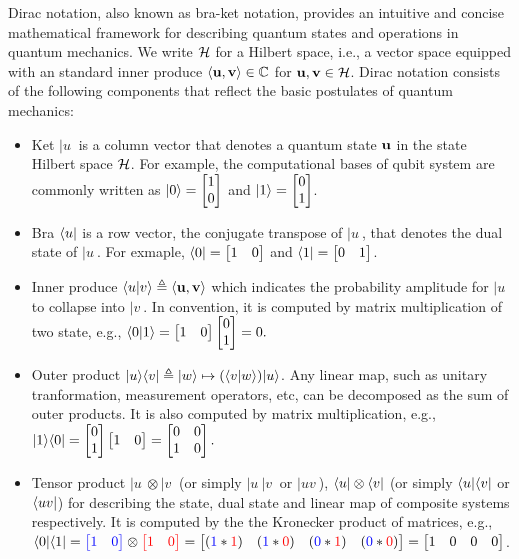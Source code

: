 Dirac notation, also known as bra-ket notation, provides an intuitive and concise mathematical framework for describing quantum states and operations in quantum mechanics. 
We write ${\mathcal{H}}$ for a Hilbert space, i.e., a vector space equipped with an standard inner produce $\langle{\mathbf{u}},{\mathbf{v}}\rangle \in {\mathbb{C}}$ for ${\mathbf{u}},{\mathbf{v}}\in{\mathcal{H}}$.
Dirac notation consists of the following components that reflect the basic postulates of quantum mechanics:
\begin{itemize}
  \item Ket $|u\>$ is a column vector that denotes a quantum state ${\mathbf{u}}$ in the state Hilbert space ${\mathcal{H}}$. For example, the computational bases of qubit system are commonly written as $|0\rangle = \begin{bmatrix}1 \\ 0\end{bmatrix}$ and $|1\rangle = \begin{bmatrix}0 \\ 1\end{bmatrix}$.
  \item Bra $\langle u|$ is a row vector, the conjugate transpose of $|u\>$, that denotes the dual state of $|u\>$. 
  For exmaple, $\langle0| = \begin{bmatrix}1 & 0\end{bmatrix}$ and $\langle1| = \begin{bmatrix}0 & 1\end{bmatrix}$.
  \item Inner produce $\langle u|v\rangle \triangleq \langle{\mathbf{u}},{\mathbf{v}}\rangle$ which indicates the probability amplitude for $|u\>$ to collapse into $|v\>$. 
  In convention, it is computed by matrix multiplication of two state, e.g., 
  $\langle0|1\rangle = \begin{bmatrix}1 & 0\end{bmatrix} \begin{bmatrix}0 \\ 1\end{bmatrix} = 0.$
  \item Outer product $|u\rangle\langle v| \triangleq |w\rangle \mapsto (\langle v|w\rangle) |u\rangle$. Any linear map, such as unitary tranformation, measurement operators, etc, can be decomposed as the sum of outer products. It is also computed by matrix multiplication, e.g., 
  $|1\rangle\langle0| = \begin{bmatrix}0 \\ 1\end{bmatrix} \begin{bmatrix}1 & 0\end{bmatrix}  = \begin{bmatrix}0 & 0 \\ 1 & 0\end{bmatrix}.$
  \item Tensor product $|u\>\otimes|v\>$ (or simply $|u\>|v\>$ or $|uv\>$), $\langle u|\otimes\langle v|$ (or simply $\langle u|\langle v|$ or $\langle uv|$) for describing the state, dual state and linear map of composite systems respectively. It is computed by the the Kronecker product of matrices, e.g., $\langle0|\langle1| = {\color{blue}\begin{bmatrix}1 & 0\end{bmatrix}}\otimes {\color{red}\begin{bmatrix}1 & 0\end{bmatrix}} = \begin{bmatrix}({\color{blue}1}*{\color{red}1}) & ({\color{blue}1}*{\color{red}0}) & ({\color{blue}0}*{\color{red}1}) & ({\color{blue}0}*{\color{red}0})\end{bmatrix} = \begin{bmatrix}1&0&0&0\end{bmatrix}$.
\end{itemize}


